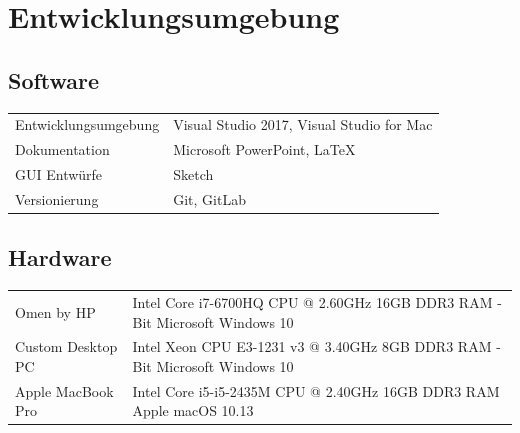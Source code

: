 \documentclass[a4paper]{scrreprt}
\begin{document}
\chapter{Entwicklungsumgebung}
 
\section{Software}
\begin{tabular}{lll}
Entwicklungsumgebung &  \multicolumn{2}{p{12cm}}{Visual Studio 2017, Visual Studio for Mac}\\
Dokumentation &  \multicolumn{2}{p{12cm}}{Microsoft PowerPoint, LaTeX}  \\
GUI Entwürfe & \multicolumn{2}{p{12cm}}{Sketch} \\
Versionierung & \multicolumn{2}{p{12cm}}{Git, GitLab} \\
\end{tabular}

 
\section{Hardware}
\begin{tabular}{lll}
Omen by HP &  \multicolumn{2}{p{12cm}}{Intel Core i7-6700HQ CPU @ 2.60GHz \newline 16GB DDR3 RAM  \newline 64-Bit Microsoft Windows 10}\\
Custom Desktop PC &  \multicolumn{2}{p{12cm}}{Intel Xeon CPU E3-1231 v3 @ 3.40GHz \newline 8GB DDR3 RAM  \newline 64-Bit Microsoft Windows 10}\\
Apple MacBook Pro &  \multicolumn{2}{p{12cm}}{Intel Core i5-i5-2435M CPU @ 2.40GHz \newline 16GB DDR3 RAM  \newline Apple macOS 10.13}\\
\end{tabular}
 
 
\printnoidxglossaries

\listoffigures
 
\end{document}
